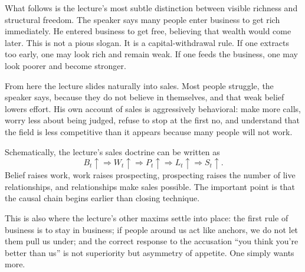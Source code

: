 \begin{figure}[h]
\centering
{}
\end{figure}

What follows is the lecture's most subtle distinction between visible richness and structural freedom. The speaker says many people enter business to get rich immediately. He entered business to get free, believing that wealth would come later. This is not a pious slogan. It is a capital-withdrawal rule. If one extracts too early, one may look rich and remain weak. If one feeds the business, one may look poorer and become stronger.

From here the lecture slides naturally into sales. Most people struggle, the speaker says, because they do not believe in themselves, and that weak belief lowers effort. His own account of sales is aggressively behavioral: make more calls, worry less about being judged, refuse to stop at the first no, and understand that the field is less competitive than it appears because many people will not work.

Schematically, the lecture's sales doctrine can be written as
\begin{equation}
B_t \uparrow \Rightarrow W_t \uparrow \Rightarrow P_t \uparrow \Rightarrow L_t \uparrow \Rightarrow S_t \uparrow.
\end{equation}
Belief raises work, work raises prospecting, prospecting raises the number of live relationships, and relationships make sales possible. The important point is that the causal chain begins earlier than closing technique.

This is also where the lecture's other maxims settle into place: the first rule of business is to stay in business; if people around us act like anchors, we do not let them pull us under; and the correct response to the accusation ``you think you're better than us'' is not superiority but asymmetry of appetite. One simply wants more.

